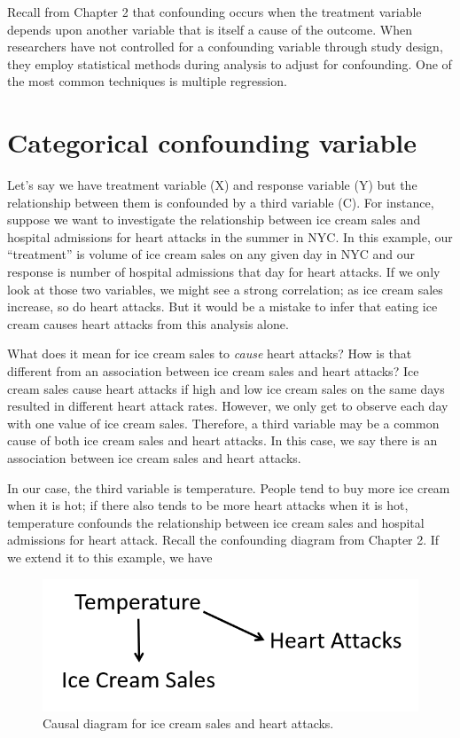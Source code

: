 \documentclass[]{book}
\begin{document}
Recall from Chapter 2 that confounding occurs when the treatment variable depends upon another variable that is itself a cause of the outcome. When researchers have not controlled for a confounding variable through study design, they employ statistical methods during analysis to adjust for confounding. One of the most common techniques is multiple regression.

\hypertarget{categorical-confounding-variable}{%
\section{Categorical confounding variable}\label{categorical-confounding-variable}}

Let's say we have treatment variable (X) and response variable (Y) but the relationship between them is confounded by a third variable (C). For instance, suppose we want to investigate the relationship between ice cream sales and hospital admissions for heart attacks in the summer in NYC. In this example, our ``treatment'' is volume of ice cream sales on any given day in NYC and our response is number of hospital admissions that day for heart attacks. If we only look at those two variables, we might see a strong correlation; as ice cream sales increase, so do heart attacks. But it would be a mistake to infer that eating ice cream causes heart attacks from this analysis alone.

What does it mean for ice cream sales to \emph{cause} heart attacks? How is that different from an association between ice cream sales and heart attacks? Ice cream sales cause heart attacks if high and low ice cream sales on the same days resulted in different heart attack rates. However, we only get to observe each day with one value of ice cream sales. Therefore, a third variable may be a common cause of both ice cream sales and heart attacks. In this case, we say there is an association between ice cream sales and heart attacks.

In our case, the third variable is temperature. People tend to buy more ice cream when it is hot; if there also tends to be more heart attacks when it is hot, temperature confounds the relationship between ice cream sales and hospital admissions for heart attack. Recall the confounding diagram from Chapter 2. If we extend it to this example, we have

\begin{figure}
\centering
\includegraphics{./images/ice_cream_graph.png}
\caption{Causal diagram for ice cream sales and heart attacks.}
\end{figure}
\end{document}
